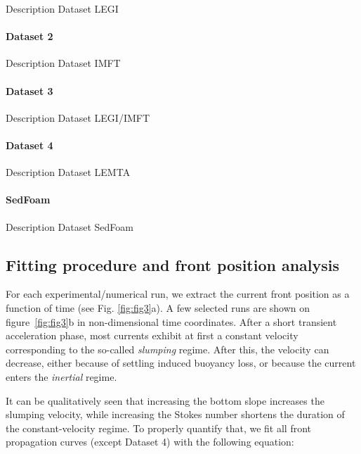 \documentclass[twocolumn]{article}
\begin{document}
Description Dataset LEGI

\paragraph{Dataset 2}

Description Dataset IMFT

\paragraph{Dataset 3}

Description Dataset LEGI/IMFT

\paragraph{Dataset 4}

Description Dataset LEMTA

\paragraph{SedFoam}

Description Dataset SedFoam

\subsection{Fitting procedure and front position analysis}

For each experimental/numerical run, we extract the current front position as a function of time (see Fig. \ref{fig:fig3}a). A few selected runs are shown on figure~\ref{fig:fig3}b in non-dimensional time coordinates. After a short transient acceleration phase, most currents exhibit at first a constant velocity corresponding to the so-called \emph{slumping} regime. After this, the velocity can decrease, either because of settling induced buoyancy loss, or because the current enters the \emph{inertial} regime.

It can be qualitatively seen that increasing the bottom slope increases the slumping velocity, while increasing the Stokes number shortens the duration of the constant-velocity regime.
%
To properly quantify that, we fit all front propagation curves (except Dataset 4) with the following equation:
\end{document}
